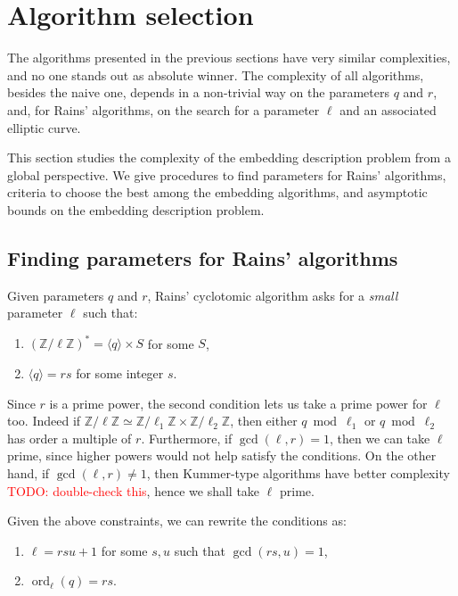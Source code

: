 \documentclass[12pt]{article}
\theoremstyle{plain}
\theoremstyle{definition}
\newcommand{\todo}[1]{\textcolor{red}{TODO: #1}}
\DeclareMathOperator{\order}{ord} %
\def\Z{\ensuremath{\mathbb{Z}}}
\newcounter{algorithm}
\begin{document}
\section{Algorithm selection}
\label{sec:selection}

The algorithms presented in the previous sections have very similar
complexities, and no one stands out as absolute winner. The complexity
of all algorithms, besides the naive one, depends in a non-trivial way
on the parameters $q$ and $r$, and, for Rains' algorithms, on the
search for a parameter $\ell$ and an associated elliptic curve.

This section studies the complexity of the embedding description
problem from a global perspective. We give procedures to find
parameters for Rains' algorithms, criteria to choose the best among
the embedding algorithms, and asymptotic bounds on the embedding
description problem.


\subsection{Finding parameters for Rains' algorithms}

Given parameters $q$ and $r$, Rains' cyclotomic algorithm asks for a
\emph{small} parameter $\ell$ such that:
\begin{enumerate}
\item $(\Z/\ell\Z)^\ast = \langle q\rangle \times S$ for some $S$,
\item $\langle q \rangle = rs$ for some integer $s$.
\end{enumerate}

Since $r$ is a prime power, the second condition lets us take a prime
power for $\ell$ too. Indeed if
$\Z/\ell\Z\simeq\Z/\ell_1\Z\times\Z/\ell_2\Z$, then either
$q\bmod\ell_1$ or $q\bmod\ell_2$ has order a multiple of $r$.
Furthermore, if $\gcd(\ell,r)=1$, then we can take $\ell$ prime, since
higher powers would not help satisfy the conditions. On the other
hand, if $\gcd(\ell,r)\ne1$, then Kummer-type algorithms have better
complexity \todo{double-check this}, hence we shall take $\ell$ prime.

Given the above constraints, we can rewrite the conditions as:
\begin{enumerate}
\item $\ell = rsu + 1$ for some $s,u$ such that $\gcd(rs,u)=1$,
\item $\order_\ell(q) = rs$.
\end{enumerate}
\end{document}
